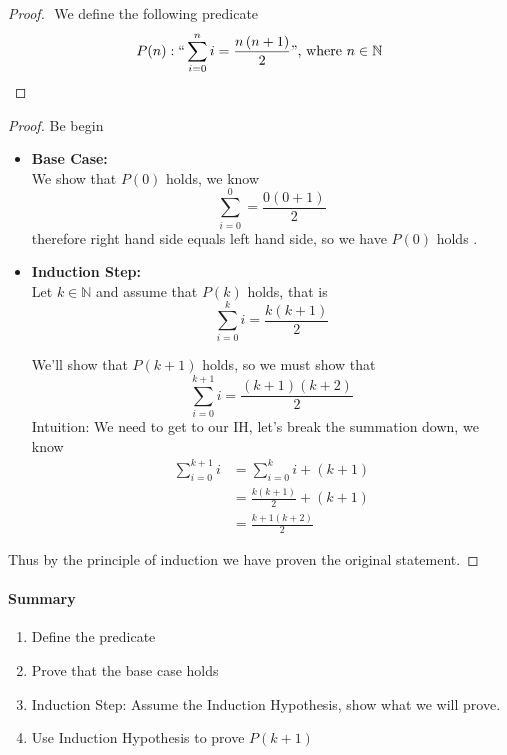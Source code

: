 \documentclass[11pt]{book}
\begin{document}
\begin{proof}
    $ $\newline
    We define the following predicate 
    \[
        P(n): `` \sum_{i=0}^{n} i = \frac{n\left( n + 1 \right) }{2} "\text{, where } n \in \mathbb{N} 
    \]

    
\end{proof}
\begin{proof}
    $ $\newline Be begin
    \begin{itemize}
        \item \textbf{Base Case:}\\
            We show that $P(0)$ holds, we know 
            \[
                \sum_{i=0}^{0} = \frac{0\left( 0 + 1 \right) }{2} 
            \]
            therefore right hand side equals left hand side, so we have $P\left(0\right) $ holds .
        \item \textbf{Induction Step:}\\
            Let $k \in \mathbb{N}$ and assume that $P(k)$ holds, that is 
            \[
                \sum_{i=0}^{k} i = \frac{k\left( k + 1 \right) }{2} 
            \]
            
            We'll show that $P(k + 1)$ holds, so we must show that 
            \[
                \sum_{i=0}^{k + 1} i = \frac{\left( k + 1 \right) \left( k + 2 \right) }{2} 
            \]
            Intuition: We need to get to our IH, let's break the summation down, we know 
            \begin{align*}
                \sum_{i=0}^{k + 1} i &= \sum_{i=0}^{k} i  + \left( k + 1 \right)   \\
                &= \frac{k\left( k + 1 \right) }{2} + \left( k + 1 \right)   \\ 
                &= \frac{k + 1\left( k + 2 \right) }{2} 
            \end{align*}
    \end{itemize}
    Thus by the principle of induction we have proven the original statement.
\end{proof}

\paragraph{Summary}
\begin{enumerate}
    \item Define the predicate 
    \item Prove that the base case holds 
    \item Induction Step: Assume the Induction Hypothesis, show what we will prove.
    \item Use Induction Hypothesis to prove $P\left(k + 1\right) $ 
\end{enumerate}
\end{document}
